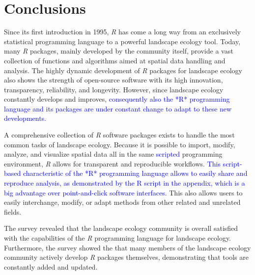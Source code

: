 \documentclass[smallextended]{svjour3}       %
\begin{document}
\hypertarget{conclusions}{%
\section{Conclusions}\label{conclusions}}

Since its first introduction in 1995, \emph{R} has come a long way from an exclusively statistical programming language to a powerful landscape ecology tool.
Today, many \emph{R} packages, mainly developed by the community itself, provide a vast collection of functions and algorithms aimed at spatial data handling and analysis.
The highly dynamic development of \emph{R} packages for landscape ecology also shows the strength of open-source software with its high innovation, transparency, reliability, and longevity.
However, since landscape ecology constantly develops and improves, \textcolor{blue}{consequently also the *R* programming language and its packages are under constant change to adapt to these new developments.}

A comprehensive collection of \emph{R} software packages exists to handle the most common tasks of landscape ecology.
Because it is possible to import, modify, analyze, and visualize spatial data all in the same \textcolor{blue}{scripted} programming environment, \emph{R} allows for transparent and reproducible workflows.
\textcolor{blue}{This script-based characteristic of the *R* programming language allows to easily share and reproduce analysis, as demonstrated by the R script in the appendix, which is a big advantage over point-and-click software interfaces.}
This also allows users to easily interchange, modify, or adapt methods from other related and unrelated fields.

The survey revealed that the landscape ecology community is overall satisfied with the capabilities of the \emph{R} programming language for landscape ecology.
Furthermore, the survey showed the that many members of the landscape ecology community actively develop \emph{R} packages themselves, demonstrating that tools are constantly added and updated.
\end{document}
